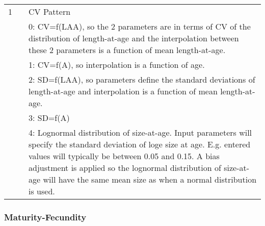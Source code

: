 \begin{longtable}{p{0.5cm} p{2cm} p{12cm}}
	   1 & & CV Pattern \\
	     & & 0: CV=f(LAA), so the 2 parameters are in terms of CV of the distribution of length-at-age and the interpolation between these 2 parameters is a function of mean length-at-age.\\
	     & & 1: CV=f(A), so interpolation is a function of age.\\
	     & & 2: SD=f(LAA), so parameters define the standard deviations of length-at-age and interpolation is a function of mean length-at-age.\\
	     & & 3: SD=f(A) \\
	     & & 4: Lognormal distribution of size-at-age.  Input parameters will specify the standard deviation of loge size at age.  E.g. entered values will typically be between 0.05 and 0.15.  A bias adjustment is applied so the lognormal distribution of size-at-age will have the same mean size as when a normal distribution is used.\\
	   \hline
	\end{longtable}

\subsubsection{Maturity-Fecundity}



